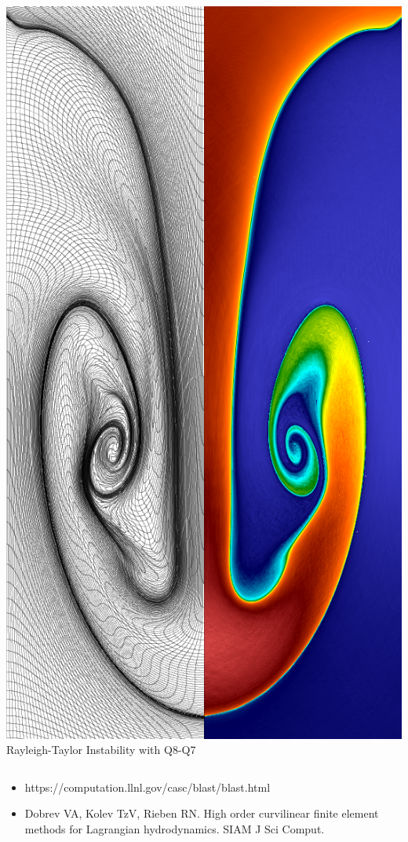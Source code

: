 \documentclass[8pt,xcolor=svgnames]{beamer}
\begin{document}
\begin{frame}
\begin{columns}
\begin{column}{0.30\textwidth}
\begin{center}
\begin{minipage}{0.95\textwidth}
\begin{alertblock}{}
\begin{center}
            \includegraphics[scale = 0.1]{figs/q8q7_RT_density.png} \\
            {\tiny Rayleigh-Taylor Instability with Q8-Q7}
            \end{center}
      \end{alertblock}
    \end{minipage}
  \end{center}
\end{column}
\end{columns}

\begin{itemize}
\item \tiny{ https://computation.llnl.gov/casc/blast/blast.html}
\item \tiny{ Dobrev VA, Kolev TzV, Rieben RN. High order curvilinear finite element methods for Lagrangian hydrodynamics. SIAM J Sci Comput.}
\end{itemize}
\end{frame}
\end{document}
